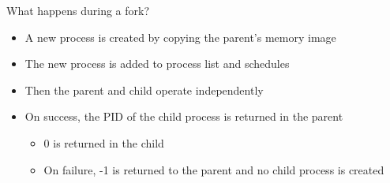 \documentclass[12pt]{article}
\begin{document}
What happens during a fork?
\begin{itemize}
    \item A new process is created by copying the parent's memory image
    \item The new process is added to process list and schedules
    \item Then the parent and child operate independently
    \item On success, the PID of the child process is returned in the parent
    \begin{itemize}
        \item 0 is returned in the child
        \item On failure, -1 is returned to the parent and no child process is created
    \end{itemize}
\end{itemize}
\end{document}
